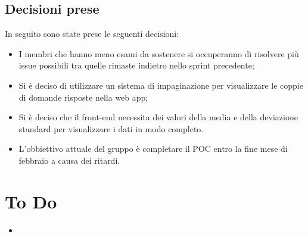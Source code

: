 \documentclass[a4paper, 12pt]{article}
\begin{document}
\subsection{Decisioni prese}
In seguito sono state prese le seguenti decisioni:
\begin{itemize}
    \item I membri che hanno meno esami da sostenere si occuperanno di risolvere più issue possibili tra quelle rimaste indietro nello sprint precedente;
    \item Si è deciso di utilizzare un sistema di impaginazione per visualizzare le coppie di domande risposte nella web app;
    \item Si è deciso che il front-end necessita dei valori della media e della deviazione standard per visualizzare i dati in modo completo.
    \item L'obbiettivo attuale del gruppo è completare il POC entro la fine mese di febbraio a causa dei ritardi.
\end{itemize}

\section{To Do}
\begin{itemize}
    \item 
\end{itemize}
\end{document}
